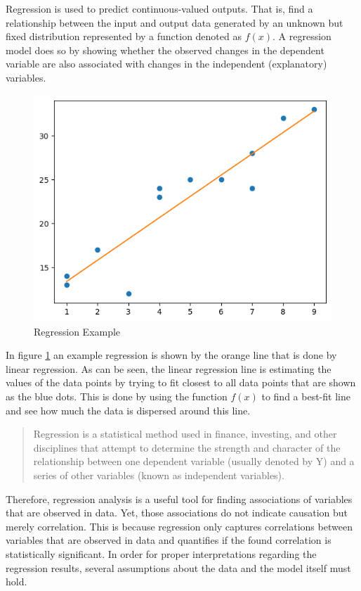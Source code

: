             Regression is used to predict continuous-valued outputs. That is, find a relationship between the input and output data generated by an unknown but fixed distribution represented by a function denoted as $f(x)$. 
            A regression model does so by showing whether the observed changes in the dependent variable are also associated with changes in the independent (explanatory) variables. 
            \begin{figure}[h!]
                \centering
                \includegraphics[scale=0.6]{figures/regression_plot.png}
                \caption{Regression Example}
                \label{fig:regression-example}
            \end{figure}
            In figure \ref{fig:regression-example} an example regression is shown by the orange line that is done by linear regression. As can be seen, the linear regression line is estimating the values of the data points by trying to fit closest to all data points that are shown as the blue dots.
            This is done by using the function $f(x)$ to find a best-fit line and see how much the data is dispersed around this line.
            \begin{quote}
                Regression is a statistical method used in finance, investing, and other disciplines that attempt to determine the strength and character of the relationship between one dependent variable (usually denoted by Y) and a series of other variables (known as independent variables). \cite{beersWhatRegressionDefinition}
            \end{quote}
            Therefore, regression analysis is a useful tool for finding associations of variables that are observed in data. Yet, those associations do not indicate causation but merely correlation.
            This is because regression only captures correlations between variables that are observed in data and quantifies if the found correlation is statistically significant.
            In order for proper interpretations regarding the regression results, several assumptions about the data and the model itself must hold.

